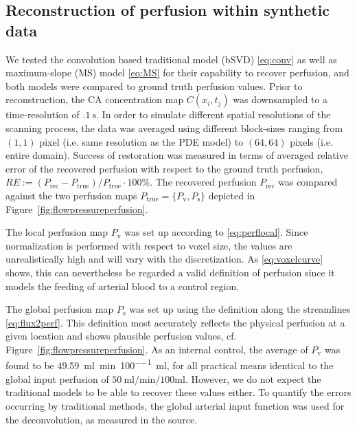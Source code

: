 \documentclass[journal,twocolumn]{IEEEtran}
\newcommand{\Perf}{P}
\newcommand{\Perfv}{P_{\mathrm{v}}}
\newcommand{\Perfs}{P_{\mathrm{s}}}
\newcommand{\siPml}{\milli\litre\per\minute\per100\milli\litre}
\begin{document}
	\subsection{Reconstruction of perfusion within synthetic data}\label{sec:RecPhantom}


	We tested the convolution based traditional model (bSVD) \eqref{eq:conv} as well as maximum-slope (MS) model \eqref{eq:MS} for their capability to recover perfusion, and both models were compared to ground truth perfusion values.
	Prior to reconstruction, the CA concentration map $C(x_i,t_j)$ was downsampled to a time-resolution of $\SI{.1}{\second}$.
	In order to simulate different spatial resolutions of the scanning process, the data was averaged using different block-sizes ranging from $(1,1)$ pixel (i.e. same resolution as the PDE model) to $(64,64)$ pixels (i.e. entire domain).		
	Success of restoration was measured in terms of averaged relative error of the recovered perfusion with respect to the ground truth perfusion, $RE :=  (\Perf_{\mathrm{rec}} - \Perf_{\mathrm{true}})/\Perf_{\mathrm{true}}\cdot 100\%$.
	The recovered perfusion $\Perf_{\mathrm{rec}}$ was compared against the two perfusion maps $\Perf_{\mathrm{true}}=\{\Perfv,\Perfs\}$ depicted in Figure~\ref{fig:flowpressureperfusion}.

	The local perfusion map $\Perfv$ was set up according to \eqref{eq:perflocal}. 
	Since normalization is performed with respect to voxel size, the values are unrealistically high and will vary with the discretization.
	As \eqref{eq:voxelcurve} shows, this can nevertheless be regarded a valid definition of perfusion since it models the feeding of arterial blood to a control region.

	The global perfusion map $\Perfs$ was set up using the definition along the streamlines \eqref{eq:flux2perf}.
	This definition most accurately reflects the physical perfusion at a given location and shows plausible perfusion values, cf. Figure~\ref{fig:flowpressureperfusion}. As an internal control, the average of $\Perfv$ was found to be \SI{49.59}{\siPml}, for all practical means identical to the global input perfusion of $\SI{50}{\siPml}$.
	However, we do not expect the traditional models to be able to recover these values either.
	To quantify the errors occurring by traditional methods, the global arterial input function was used for the deconvolution, as measured in the source.
\end{document}
